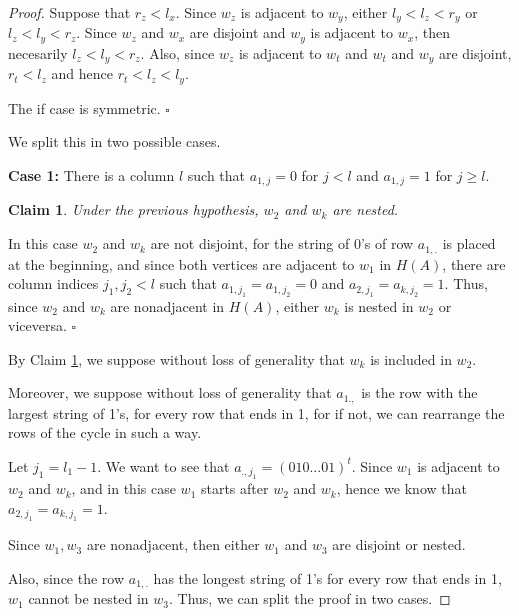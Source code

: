 \documentclass[a4paper,10pt]{report}
\theoremstyle{plain}
\newtheorem{claim}{Claim}[section]
\theoremstyle{remark}
\theoremstyle{plain}
\newcommand*{\QED}{\hfill\ensuremath{\square}}%
\begin{document}
\begin{proof}
	Suppose that $r_z < l_x$. Since $w_z$ is adjacent to $w_y$, either $l_y < l_z < r_y$ or $l_z < l_y < r_z$. 
	Since $w_z$ and $w_x$ are disjoint and $w_y$ is adjacent to $w_x$, then necesarily $l_z < l_y < r_z$. 
Also, since $w_z$ is adjacent to $w_t$ and $w_t$ and $w_y$ are disjoint, 
$r_t < l_z$ and hence $r_t < l_z < l_y$.

	The if case is symmetric. \QED	
	
	\vspace{1mm}
	We split this in two possible cases. 
	
	\textbf{Case 1:} There is a column $l$ such that $a_{1,j} = 0$ for $j<l$ and $a_{1,j} = 1$ for $j \geq l$.
		
	\vspace{.5mm}
	\begin{claim} \label{2N_c1_A}
		Under the previous hypothesis, $w_2$ and $w_k$ are nested.
	\end{claim}
	
	In this case $w_2$ and $w_k$ are not disjoint, for the string of 0's of row $a_{1,.}$ is placed at the beginning, and since both vertices are adjacent to $w_1$ in $H(A)$, there are column indices $j_1, j_2<l$ such that $a_{1,j_1} = a_{1,j_2} = 0$ and $a_{2, j_1} = a_{k, j_2} = 1$. 
	Thus, since $w_{2}$ and $w_k$ are nonadjacent in $H(A)$, either $w_k$ is nested in $w_2$ or viceversa. \QED
		
	By Claim \ref{2N_c1_A}, we suppose without loss of generality that $w_k$ is included in $w_2$.
	
	Moreover, we suppose without loss of generality that $a_{1.,}$ is the row with
	the largest string of 1's, for every row that ends in 1, for if not, we can rearrange the rows of the cycle in such a way.
	
	 
	\vspace{.5mm}
	Let $j_1 = l_1 - 1$. 
	We want to see that $a_{., j_1} = ( 0 1 0 ... 0 1)^{t}$. 
	Since $w_1$ is adjacent to $w_2$ and $w_k$, and in this case $w_1$ starts after $w_2$ and $w_k$, hence we know that $a_{2, j_1} = a_{k, j_1} = 1$.

	Since $w_1, w_3$ are nonadjacent, then either $w_1$ and $w_3$ are disjoint or nested.	
	
	Also, since the row $a_{1,.}$ has the longest string of 1's for every row that ends in 1, $w_1$ cannot be nested in $w_3$. 
	Thus, we can split the proof in two cases.
	

\end{proof}
\end{document}
